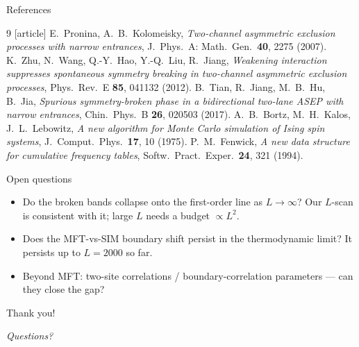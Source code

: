 \documentclass[aspectratio=169,10pt]{beamer}
\begin{document}
\begin{frame}{References}
  \vspace{-1.8em}
  \small
  \begin{thebibliography}{9}
    [article]
      E.~Pronina, A.~B.~Kolomeisky,
      \emph{Two-channel asymmetric exclusion processes with narrow entrances},
      J.~Phys.~A: Math.\ Gen.\ \textbf{40}, 2275 (2007).
      K.~Zhu, N.~Wang, Q.-Y.~Hao, Y.-Q.~Liu, R.~Jiang,
      \emph{Weakening interaction suppresses spontaneous symmetry breaking in
        two-channel asymmetric exclusion processes},
      Phys.\ Rev.\ E \textbf{85}, 041132 (2012).
      B.~Tian, R.~Jiang, M.~B.~Hu, B.~Jia,
      \emph{Spurious symmetry-broken phase in a bidirectional two-lane ASEP
        with narrow entrances},
      Chin.\ Phys.\ B \textbf{26}, 020503 (2017).
      A.~B.~Bortz, M.~H.~Kalos, J.~L.~Lebowitz,
      \emph{A new algorithm for Monte Carlo simulation of Ising spin
        systems},
      J.~Comput.\ Phys.\ \textbf{17}, 10 (1975).
      P.~M.~Fenwick,
      \emph{A new data structure for cumulative frequency tables},
      Softw.\ Pract.\ Exper.\ \textbf{24}, 321 (1994).
  \end{thebibliography}
\end{frame}

\begin{frame}{Open questions}
  \begin{itemize}
    \item Do the broken bands collapse onto the first-order line as
      $L\to\infty$? Our $L$-scan is consistent with it; large $L$ needs a
      budget $\propto L^2$.
    \item Does the MFT-vs-SIM boundary shift persist in the thermodynamic
      limit? It persists up to $L=2000$ so far.
    \item Beyond MFT: two-site correlations / boundary-correlation
      parameters --- can they close the gap?
  \end{itemize}
\end{frame}

\begin{frame}
  \centering
  \vspace{1.5em}
  {\LARGE Thank you!}

  \vspace{1em}
  \emph{Questions?}
\end{frame}
\end{document}
